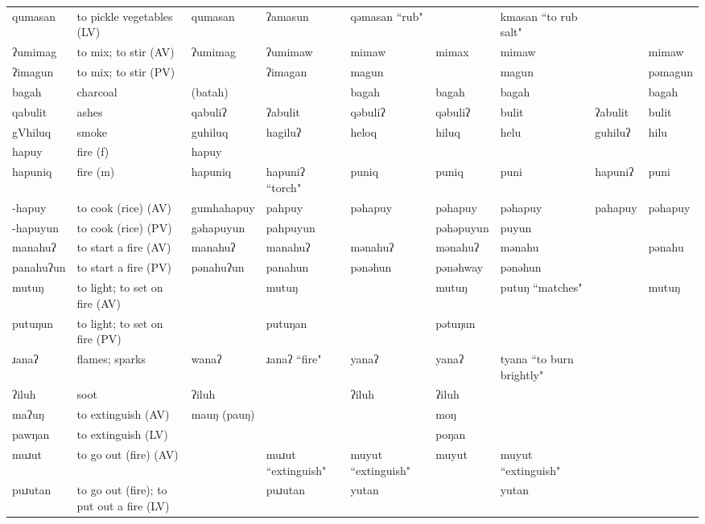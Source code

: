 \begin{landscape}
\begin{longtable}{*{9}{>{\raggedright\arraybackslash}p{}}}
\text{*}qumasan & to pickle vegetables (LV) & qumasan & ʔamasun & qəmasan ``rub" &  & kmasan ``to rub salt" &  & \\
\text{*}ʔumimag & to mix; to stir (AV) & ʔumimag & ʔumimaw & mimaw & mimax & mimaw &  & mimaw\\
\text{*}ʔimagun & to mix; to stir (PV) &  & ʔimagan & magun &  & magun &  & pəmagun\\
\text{*}bagah & charcoal & (batah) &  & bagah & bagah & bagah &  & bagah\\
\text{*}qabulit & ashes & qabuliʔ & ʔabulit & qəbuliʔ & qəbuliʔ & bulit & ʔabulit & bulit\\
\text{*}gVhiluq & smoke & guhiluq & hagiluʔ & heloq & hiluq & helu & guhiluʔ & hilu\\
\text{*}hapuy & fire (f) & hapuy &  &  &  &  &  & \\
\text{*}hapuniq & fire (m) & hapuniq & hapuniʔ ``torch" & puniq & puniq & puni & hapuniʔ & puni\\
\text{*}-hapuy & to cook (rice) (AV) & gumhahapuy & pahpuy & pəhapuy & pəhapuy & pəhapuy & pahapuy & pəhapuy\\
\text{*}-hapuyun & to cook (rice) (PV) & gəhapuyun & pahpuyun &  & pəhəpuyun & puyun &  & \\
\text{*}manahuʔ & to start a fire (AV) & manahuʔ & manahuʔ & mənahuʔ & mənahuʔ & mənahu &  & pənahu\\
\text{*}panahuʔun & to start a fire (PV) & pənahuʔun & panahun & pənəhun & pənəhway & pənəhun &  & \\
\text{*}mutuŋ & to light; to set on fire (AV) &  & mutuŋ &  & mutuŋ & putuŋ ``matches" &  & mutuŋ\\
\text{*}putuŋun & to light; to set on fire (PV) &  & putuŋan &  & pətuŋun &  &  & \\
\text{*}ɹanaʔ & flames; sparks & wanaʔ & ɹanaʔ ``fire" & yanaʔ & yanaʔ & tyana ``to burn brightly" &  & \\
\text{*}ʔiluh & soot & ʔiluh &  & ʔiluh & ʔiluh &  &  & \\
\text{*}maʔuŋ & to extinguish (AV) & mauŋ (pauŋ) &  &  & moŋ &  &  & \\
\text{*}pawŋan & to extinguish (LV) &  &  &  & poŋan &  &  & \\
\text{*}muɹut & to go out (fire) (AV) &  & muɹut ``extinguish" & muyut ``extinguish" & muyut & muyut ``extinguish" &  & \\
\text{*}puɹutan & to go out (fire); to put out a fire (LV) &  & puɹutan & yutan &  & yutan &  & \\

\end{longtable}
\end{landscape}
